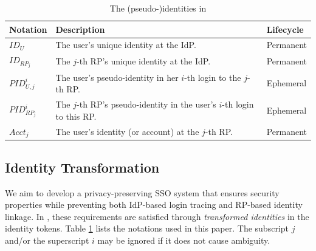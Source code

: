 \begin{table}
\footnotesize
    \caption{The (pseudo-)identities in \usso}
    \centering
    \begin{tabular}{|p{1.0cm}|p{5.1cm}|p{1.13cm}|} \hline
    {\textbf{Notation}} & {\textbf{Description}} & {\textbf{Lifecycle}} \\ \hline
    {$ID_U$} & {The user's unique identity at the IdP.} & {Permanent} \\ \hline
    {$ID_{RP_j}$} & {The $j$-th RP's unique identity at the IdP.} & {Permanent} \\ \hline
    {$PID_{U,j}^i$} & {The user's pseudo-identity in her $i$-th login to the $j$-th RP.} & {Ephemeral} \\ \hline
    {$PID_{RP_j}^i$} & {The $j$-th RP's pseudo-identity in the user's $i$-th login to this RP.} & {Ephemeral} \\ \hline
    {$Acct_j$} & {The user's identity (or account) at the $j$-th RP.} & {Permanent} \\ \hline
    \end{tabular}
    \label{tbl:notations-dilemma}
\end{table}

\subsection{Identity Transformation}
\label{subsec:solutions}

We aim to develop a privacy-preserving SSO system that ensures security properties while preventing both IdP-based login tracing and RP-based identity linkage.
In \usso, these requirements are satisfied through \emph{transformed identities} in the identity tokens. Table \ref{tbl:notations-dilemma} lists the notations used in this paper.
The subscript $j$ and/or the superscript $i$ may be ignored if it does not cause ambiguity.

